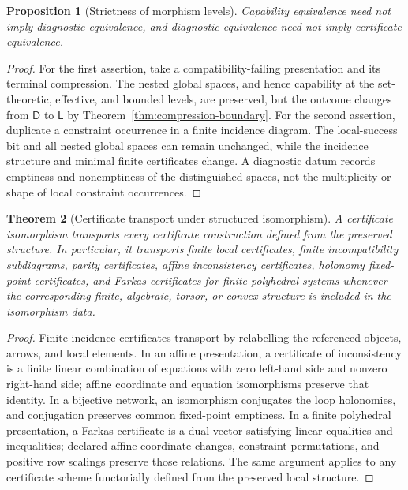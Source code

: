 \documentclass[11pt]{article}
\theoremstyle{plain}
\newtheorem{theorem}{Theorem}[section]
\newtheorem{proposition}[theorem]{Proposition}
\theoremstyle{definition}
\theoremstyle{remark}
\begin{document}
\begin{proposition}[Strictness of morphism levels]
\label{prop:morphism-level-strictness}
Capability equivalence need not imply diagnostic equivalence, and diagnostic
equivalence need not imply certificate equivalence.
\end{proposition}

\begin{proof}
For the first assertion, take a compatibility-failing presentation and its
terminal compression. The nested global spaces, and hence capability at the
set-theoretic, effective, and bounded levels, are preserved, but the outcome
changes from $\mathsf D$ to $\mathsf L$ by
Theorem~\ref{thm:compression-boundary}. For the second assertion, duplicate a
constraint occurrence in a finite incidence diagram. The local-success bit and
all nested global spaces can remain unchanged, while the incidence structure and
minimal finite certificates change. A diagnostic datum records emptiness and
nonemptiness of the distinguished spaces, not the multiplicity or shape of local
constraint occurrences.
\end{proof}

\begin{theorem}[Certificate transport under structured isomorphism]
\label{thm:certificate-transport-monograph}
A certificate isomorphism transports every certificate construction defined from
the preserved structure. In particular, it transports finite local certificates,
finite incompatibility subdiagrams, parity certificates, affine inconsistency
certificates, holonomy fixed-point certificates, and Farkas certificates for
finite polyhedral systems whenever the corresponding finite, algebraic, torsor,
or convex structure is included in the isomorphism data.
\end{theorem}

\begin{proof}
Finite incidence certificates transport by relabelling the referenced objects,
arrows, and local elements. In an affine presentation, a certificate of
inconsistency is a finite linear combination of equations with zero left-hand
side and nonzero right-hand side; affine coordinate and equation isomorphisms
preserve that identity. In a bijective network, an isomorphism conjugates the
loop holonomies, and conjugation preserves common fixed-point emptiness. In a
finite polyhedral presentation, a Farkas certificate is a dual vector satisfying
linear equalities and inequalities; declared affine coordinate changes,
constraint permutations, and positive row scalings preserve those relations. The
same argument applies to any certificate scheme functorially defined from the
preserved local structure.
\end{proof}
\end{document}
